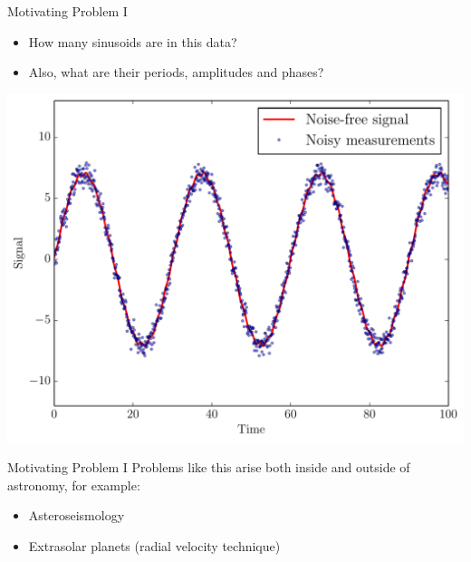 
\begin{frame}[t,plain]
\titlepage
\end{frame}

\begin{frame}[t]{Motivating Problem I}
\begin{itemize}
\item How many sinusoids are in this data?
\item Also, what are their periods, amplitudes and phases?
\end{itemize}
\begin{center}
\includegraphics[scale=0.35]{sinewave_data.pdf}
\end{center}
\end{frame}

\begin{frame}[t]{Motivating Problem I}
Problems like this arise both inside and outside of astronomy,
for example:
\vspace{20pt}
\begin{itemize}
\item Asteroseismology
\item Extrasolar planets (radial velocity technique)
\end{itemize}
\end{frame}

